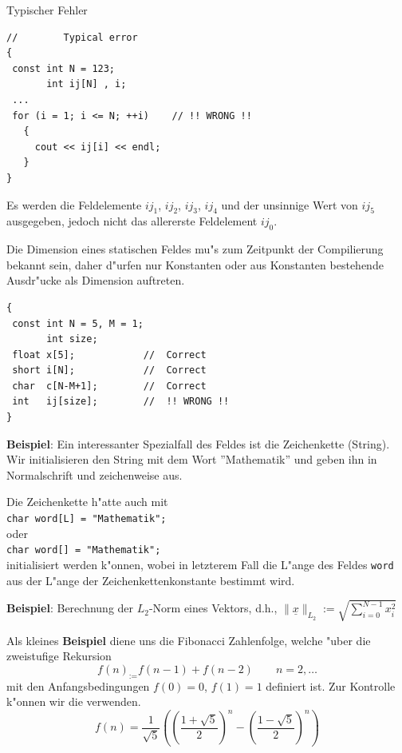 Typischer Fehler

\begin{minipage} {0.95\textwidth}
\begin{verbatim}
//        Typical error
{
 const int N = 123;
       int ij[N] , i;
 ...
 for (i = 1; i <= N; ++i)    // !! WRONG !!
   {
     cout << ij[i] << endl;
   }
}
\end{verbatim}
\end{minipage}

\noindent
Es werden die Feldelemente $ij_1$, $ij_2$, $ij_3$, $ij_4$ und
der unsinnige Wert von $ij_5$ ausgegeben, jedoch  nicht das
allererste Feldelement $ij_0$\enspace.

Die Dimension eines statischen Feldes mu"s zum Zeitpunkt der
Compilierung bekannt sein, daher d"urfen nur Konstanten oder
aus Konstanten bestehende Ausdr"ucke als Dimension auftreten.

\begin{minipage} {0.95\textwidth}
\begin{verbatim}
{
 const int N = 5, M = 1;
       int size;
 float x[5];            //  Correct
 short i[N];            //  Correct
 char  c[N-M+1];        //  Correct
 int   ij[size];        //  !! WRONG !!
}
\end{verbatim}
\end{minipage}

\textbf{Beispiel}:
Ein interessanter Spezialfall des Feldes ist die
Zeichenkette (String). Wir initialisieren den String mit
dem Wort ''Mathematik'' und  geben ihn in Normalschrift und
zeichenweise aus.
%
%

Die Zeichenkette h"atte auch mit
\\
\verb|char word[L] = "Mathematik";|
\\
oder
\\
\verb|char word[] = "Mathematik";|
\\
initialisiert werden k"onnen, wobei in letzterem Fall
die L"ange des Feldes \verb|word| aus der L"ange der
Zeichenkettenkonstante bestimmt wird.

\textbf{Beispiel}:
Berechnung der $L_2$-Norm eines Vektors, d.h.,
$\parallel \underline{x} \parallel_{L_2} :=
 \sqrt{\sum\limits_{i=0}^{N-1} x_i^2}
$
%
%

Als kleines \textbf{Beispiel} diene uns die Fibonacci Zahlenfolge,
welche "uber die zweistufige Rekursion
$$
f(n) _:= f(n-1) + f(n-2) \qquad n=2,\ldots
$$
mit den Anfangsbedingungen $f(0) = 0$, $f(1) = 1$ definiert ist.
Zur Kontrolle k"onnen wir die
verwenden.
$$
f(n) = \frac{1}{\sqrt{5}}
 \left( \left(\frac{1+\sqrt{5}}{2}\right)^n
      - \left(\frac{1-\sqrt{5}}{2}\right)^n
 \right)
$$
%
%

